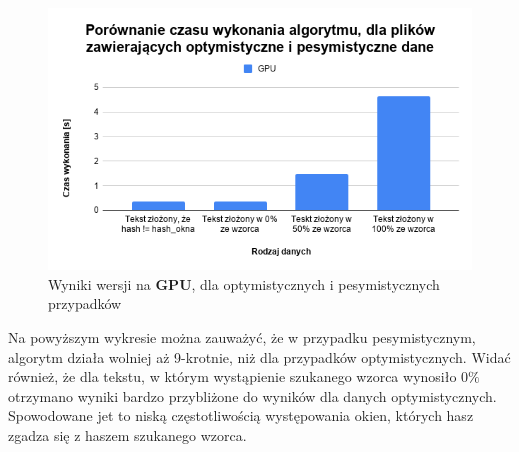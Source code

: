 \begin{figure}[H]
    \centering
    \includegraphics[width=\linewidth]{images/wykres43.png}
    \caption{Wyniki wersji na \textbf{GPU}, dla optymistycznych i pesymistycznych przypadków}
    \label{fig:chart_3}
\end{figure}

Na powyższym wykresie można zauważyć, że w przypadku pesymistycznym, algorytm działa wolniej aż 9-krotnie, niż dla przypadków optymistycznych. Widać również, że dla tekstu, w którym wystąpienie szukanego wzorca wynosiło \textit{$0\%$} otrzymano wyniki bardzo przybliżone do wyników dla danych optymistycznych. Spowodowane jet to niską częstotliwością występowania okien, których hasz zgadza się z haszem szukanego wzorca.